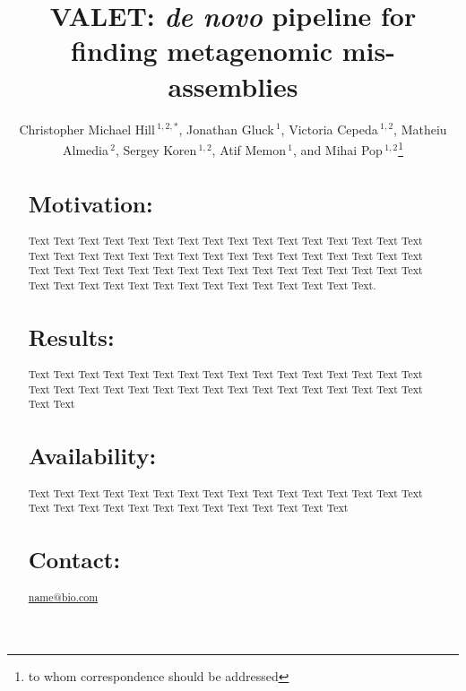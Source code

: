 \documentclass{bioinfo}
\begin{document}

\title[VALET]{VALET: \emph{de novo} pipeline for finding metagenomic mis-assemblies}
\author[Hill \textit{et~al}]{Christopher Michael Hill\,$^{1,2,*}$, Jonathan Gluck\,$^{1}$, Victoria Cepeda\,$^{1,2}$, Matheiu Almedia\,$^{2}$, Sergey Koren\,$^{1,2}$, Atif Memon\,$^{1}$, and Mihai Pop\,$^{1,2}$\footnote{to whom correspondence should be addressed}}
\address{$^{1}$Department of Computer Science,
University of Maryland, College Park, Maryland, 20742
USA\\ $^{2}$ Center
for Bioinformatics and Computational Biology, University of
Maryland, College Park, Maryland, 20742 USA.}



\maketitle

\begin{abstract}

\section{Motivation:}
Text Text Text  Text Text Text Text Text Text Text Text
Text  Text Text Text Text Text Text Text Text Text  Text Text Text Text Text Text Text Text Text  Text Text Text Text Text Text Text Text Text  Text Text Text Text Text Text Text Text Text  Text Text Text Text Text Text Text Text Text  Text Text Text Text Text.

\section{Results:}
Text  Text Text Text Text Text Text Text Text Text  Text Text Text Text Text Text Text Text Text  Text Text Text Text Text Text Text Text Text  Text Text Text Text Text Text

\section{Availability:}
Text  Text Text Text Text Text Text Text Text Text  Text Text Text Text Text Text Text Text Text  Text Text Text Text Text Text Text Text Text  Text

\section{Contact:} \href{name@bio.com}{name@bio.com}
\end{abstract}
\end{document}
